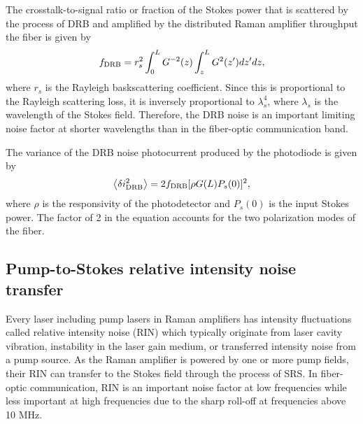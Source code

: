 \documentclass[10pt,letterpaper]{article}
\begin{document}
The crosstalk-to-signal ratio or fraction of the Stokes power that is scattered by the process of DRB and amplified by the distributed Raman amplifier throughput the fiber is given by \cite{nissov1999electronlett}
\begin{equation}
f_{\rm DRB}=r_s^2 \int_0^L{G^{-2}(z) \int_z^L{G^2(z') dz'} dz},
\end{equation}
where $r_s$ is the Rayleigh baskscattering coefficient. Since this is proportional to the Rayleigh scattering loss, it is inversely proportional to $\lambda_s^4$, where $\lambda_s$ is the wavelength of the Stokes field. Therefore, the DRB noise is an important limiting noise factor at shorter wavelengths than in the fiber-optic communication band. 

The variance of the DRB noise photocurrent produced by the photodiode is given by \cite{headley2005elsevieracademicpress}
\begin{equation}
\left\langle \delta i_{\rm DRB}^2\right\rangle = 2 f_{\rm DRB} [\rho G(L) P_s(0)]^2,
\label{eq:DRB}
\end{equation}
where $\rho$ is the responsivity of the photodetector and $P_s(0)$ is the input Stokes power. The factor of 2 in the equation accounts for the two polarization modes of the fiber. 

\subsection{Pump-to-Stokes relative intensity noise transfer}
Every laser including pump lasers in Raman amplifiers has intensity fluctuations called relative intensity noise (RIN) which typically originate from laser cavity vibration, instability in the laser gain medium, or transferred intensity noise from a pump source. As the Raman amplifier is powered by one or more pump fields, their RIN can transfer to the Stokes field through the process of SRS. In fiber-optic communication, RIN is an important noise factor at low frequencies while less important at high frequencies due to the sharp roll-off at frequencies above 10 MHz. 
\end{document}
